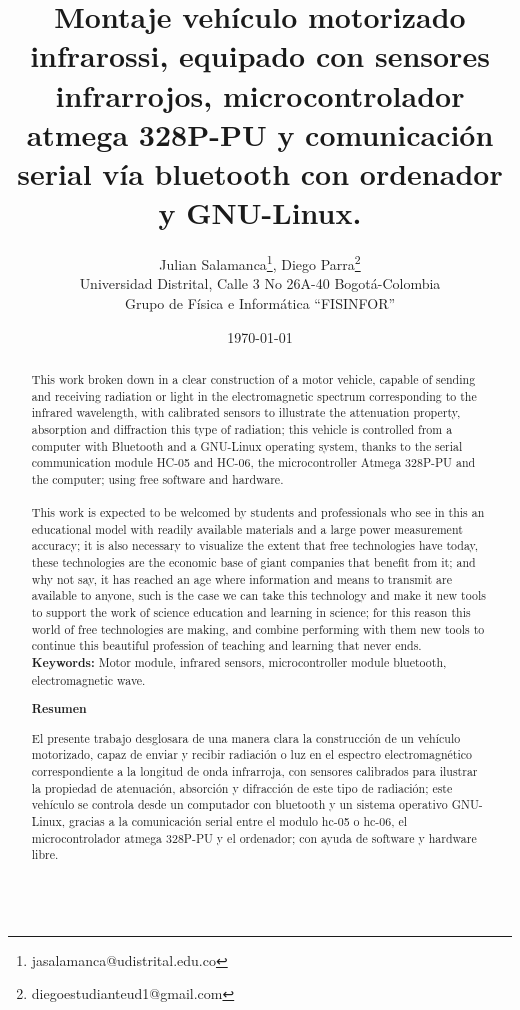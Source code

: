 \documentclass[12]{article}
\title{\bf{Montaje vehículo motorizado infrarossi, equipado con sensores infrarrojos, microcontrolador atmega 328P-PU y comunicación serial vía bluetooth con ordenador y GNU-Linux.}}
\author{Julian Salamanca\footnote{jasalamanca@udistrital.edu.co}, Diego Parra\footnote{diegoestudianteud1@gmail.com} \\
  Universidad Distrital, Calle 3 No 26A-40 Bogotá-Colombia\\
  Grupo de Física e Informática ``FISINFOR''
}
\date{\today}
\def\tablename{Tabla}%
\begin{document}
\renewcommand{\tablename}{Tabla}
\maketitle
\vspace{-0.8cm}
\begin{abstract}
This work broken down in a clear construction of a motor vehicle, capable of sending and receiving radiation or light in the electromagnetic spectrum corresponding to the infrared wavelength, with calibrated sensors to illustrate the attenuation property, absorption and diffraction this type of radiation; this vehicle is controlled from a computer with Bluetooth and a GNU-Linux operating system, thanks to the serial communication module HC-05 and HC-06, the microcontroller Atmega 328P-PU and the computer; using free software and hardware.\\ \\
This work is expected to be welcomed by students and professionals who see in this an educational model with readily available materials and a large power measurement accuracy; it is also necessary to visualize the extent that free technologies have today, these technologies are the economic base of giant companies that benefit from it; and why not say, it has reached an age where information and means to transmit are available to anyone, such is the case we can take this technology and make it new tools to support the work of science education and learning in science; for this reason this world of free technologies are making, and combine performing with them new tools to continue this beautiful profession of teaching and learning that never ends.\\ 
{\bf{Keywords:}} Motor module, infrared sensors, microcontroller module bluetooth, electromagnetic wave.
\begin{center}
{\bf{Resumen}} 
\end{center}
El presente trabajo desglosara de una manera clara la construcción de un vehículo motorizado, capaz de enviar y recibir radiación o luz en el espectro electromagnético correspondiente  a la longitud de onda infrarroja,   con sensores calibrados para ilustrar la propiedad de atenuación, absorción y  difracción de este tipo de radiación; este vehículo se controla  desde un computador con bluetooth y un sistema operativo GNU-Linux, gracias a la comunicación serial entre el modulo hc-05 o hc-06, el microcontrolador atmega  328P-PU y el ordenador; con ayuda de software y hardware libre. \\\\

\end{abstract}
\end{document}
